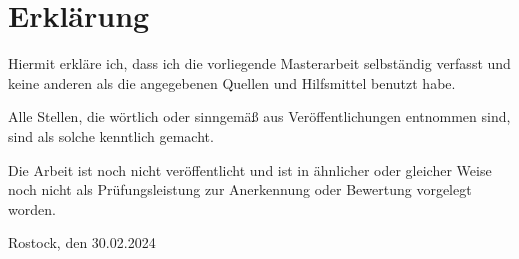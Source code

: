 \chapter*{Erklärung}
Hiermit erkläre ich, dass ich die vorliegende Masterarbeit selbständig verfasst und keine anderen als die angegebenen Quellen und Hilfsmittel benutzt habe.

Alle Stellen, die wörtlich oder sinngemäß aus Veröffentlichungen entnommen sind, sind als solche kenntlich gemacht.

Die Arbeit ist noch nicht veröffentlicht und ist in ähnlicher oder gleicher Weise noch nicht als Prüfungsleistung zur Anerkennung oder Bewertung vorgelegt worden.

Rostock, den 30.02.2024
\\
\\
\\

\begin{Form}
\end{Form}